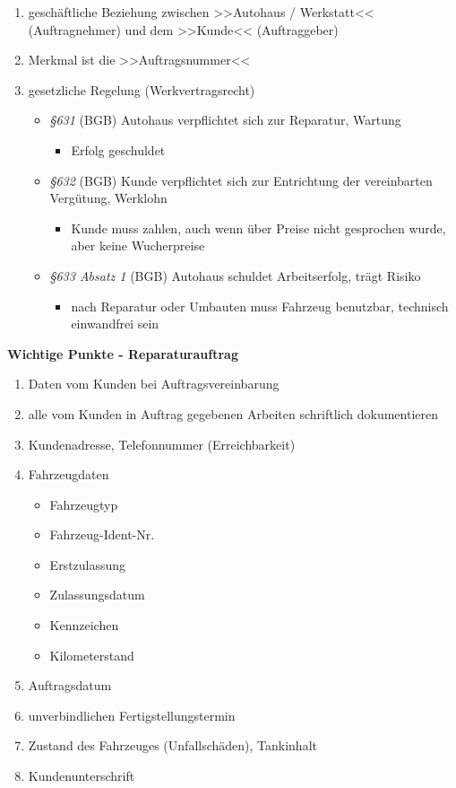 \begin{enumerate}
\item
  geschäftliche Beziehung zwischen >>Autohaus / Werkstatt<<
  (Auftragnehmer) und dem >>Kunde<< (Auftraggeber)
\item
  Merkmal ist die >>Auftragsnummer<<
\item
  gesetzliche Regelung (Werkvertragsrecht)

  \begin{itemize}
  \item
    \emph{§631} (BGB) Autohaus verpflichtet sich zur Reparatur, Wartung

    \begin{itemize}
    \item
      Erfolg geschuldet
    \end{itemize}
  \item
    \emph{§632} (BGB) Kunde verpflichtet sich zur Entrichtung der
    vereinbarten Vergütung, Werklohn

    \begin{itemize}
    \item
      Kunde muss zahlen, auch wenn über Preise nicht gesprochen wurde,
      aber keine Wucherpreise
    \end{itemize}
  \item
    \emph{§633 Absatz 1} (BGB) Autohaus schuldet Arbeitserfolg, trägt
    Risiko

    \begin{itemize}
    \item
      nach Reparatur oder Umbauten muss Fahrzeug benutzbar, technisch
      einwandfrei sein
    \end{itemize}
  \end{itemize}
\end{enumerate}

\textbf{Wichtige Punkte - Reparaturauftrag}

\begin{enumerate}
\item
  Daten vom Kunden bei Auftragsvereinbarung
\item
  alle vom Kunden in Auftrag gegebenen Arbeiten schriftlich
  dokumentieren
\item
  Kundenadresse, Telefonnummer (Erreichbarkeit)
\item
  Fahrzeugdaten

  \begin{itemize}
  \item
    Fahrzeugtyp
  \item
    Fahrzeug-Ident-Nr.
  \item
    Erstzulassung
  \item
    Zulassungsdatum
  \item
    Kennzeichen
  \item
    Kilometerstand
  \end{itemize}
\item
  Auftragsdatum
\item
  unverbindlichen Fertigstellungstermin
\item
  Zustand des Fahrzeuges (Unfallschäden), Tankinhalt
\item
  Kundenunterschrift
\end{enumerate}

